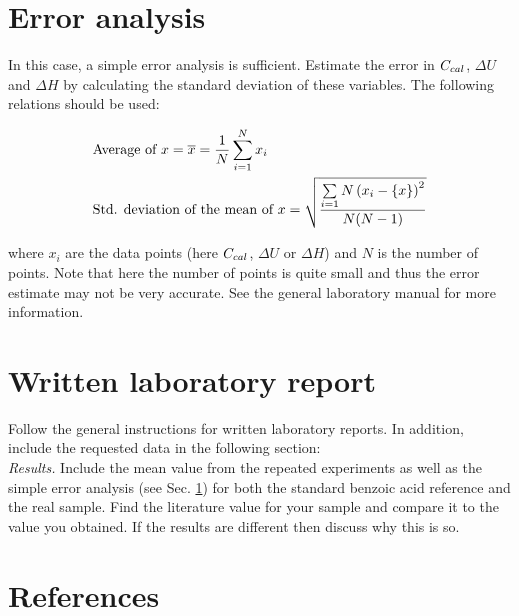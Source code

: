 \documentclass[byrevtex,amssymb,aps,pra,floatfix,letterpaper]{revtex4}
\begin{document}
\section{Error analysis}
\label{sec6}

In this case, a simple error analysis is sufficient. Estimate the error in $C_{\tiny cal}$, $\Delta U$ and $\Delta H$ by calculating the standard deviation of these variables. The following relations should be used:

\begin{align}
\label{eq16}
& \textnormal{Average of }x = \overline{x} = \frac{1}{N}\sum\limits_{i=1}^N x_i\\
\notag
& \textnormal{Std. deviation of the mean of }x = \sqrt{\frac{\sum\limits_{i=1}{N}\left(x_i - \lbrace x\rbrace\right)^2}{N(N-1)}}
\end{align}

\noindent
where $x_i$ are the data points (here $C_{\tiny cal}$, $\Delta U$ or $\Delta H$) and $N$ is the number of points. Note that here the number of points is quite small and thus the error estimate may not be very accurate. See the general laboratory manual for more information.

\section{Written laboratory report}

Follow the general instructions for written laboratory reports. In addition, include the requested data in the following section:\\

\noindent
\textit{Results.} Include the mean value from the repeated experiments as well as the simple error analysis (see Sec. \ref{sec6}) for both the standard benzoic acid reference and the real sample. Find the literature value for your sample and compare it to the value you obtained. If the results are different then discuss why this is so.

\section{References}

\vspace{-1cm}


\end{document}
